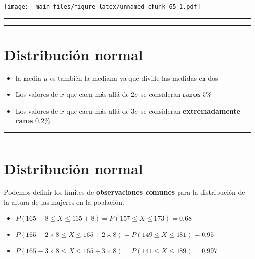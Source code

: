 \documentclass[
]{book}
\providecommand{\tightlist}{%
  \setlength{\itemsep}{0pt}\setlength{\parskip}{0pt}}
\begin{document}
\texttt{[image: \_main\_files/figure-latex/unnamed-chunk-65-1.pdf]}

\begin{center}\rule{0.5\linewidth}{0.5pt}\end{center}

\begin{center}\rule{0.5\linewidth}{0.5pt}\end{center}

\hypertarget{distribuciuxf3n-normal-4}{%
\section{Distribución normal}\label{distribuciuxf3n-normal-4}}

\begin{itemize}
\tightlist
\item
  la media \(\mu\) es también la mediana ya que divide las medidas en dos
\item
  Los valores de \(x\) que caen más allá de 2\(\sigma\) se consideran \textbf{raros} \(5\%\)
\item
  Los valores de \(x\) que caen más allá de 3\(\sigma\) se consideran \textbf{extremadamente raros} \(0.2\%\)
\end{itemize}

\begin{center}\rule{0.5\linewidth}{0.5pt}\end{center}

\begin{center}\rule{0.5\linewidth}{0.5pt}\end{center}

\hypertarget{distribuciuxf3n-normal-5}{%
\section{Distribución normal}\label{distribuciuxf3n-normal-5}}

Podemos definir los límites de \textbf{observaciones comunes} para la distribución de la altura de las mujeres en la población.

\begin{itemize}
\tightlist
\item
  \(P(165-8 \leq X \leq 165+8)=P(157 \leq X \leq 173)=0.68\)
\item
  \(P(165-2 \times 8 \leq X \leq 165+2\times 8)=P(149 \leq X \leq 181)=0.95\)
\item
  \(P(165-3 \times 8 \leq X \leq 165+3\times 8)=P(141 \leq X \leq 189)=0.997\)
\end{itemize}
\end{document}
